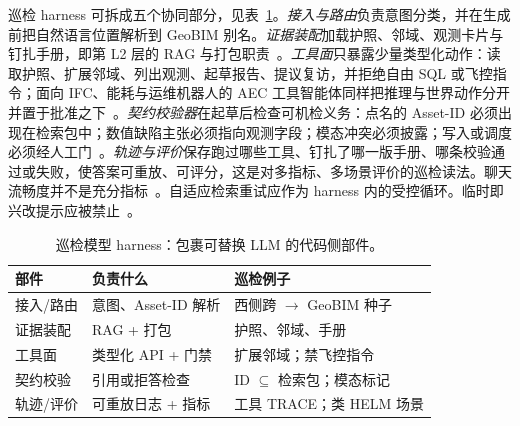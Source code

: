 巡检 harness 可拆成五个协同部分，见表~\ref{tab:ch8-harness}。\emph{接入与路由}负责意图分类，并在生成前把自然语言位置解析到 GeoBIM 别名。\emph{证据装配}加载护照、邻域、观测卡片与钉扎手册，即第 L2 层的 RAG 与打包职责~\cite{lewis2020,peng2024,krutli2025fmrags}。\emph{工具面}只暴露少量类型化动作：读取护照、扩展邻域、列出观测、起草报告、提议复访，并拒绝自由 SQL 或飞控指令；面向 IFC、能耗与运维机器人的 AEC 工具智能体同样把推理与世界动作分开并置于批准之下~\cite{gao2026ifcagent,zhang2025llmagentschema,luo2025llmdtrobot,guo2025bimllmquery}。\emph{契约校验器}在起草后检查可机检义务：点名的 Asset-ID 必须出现在检索包中；数值缺陷主张必须指向观测字段；模态冲突必须披露；写入或调度必须经人工门~\cite{ji2023,pan2024b,buga2025llmfmsql}。\emph{轨迹与评价}保存跑过哪些工具、钉扎了哪一版手册、哪条校验通过或失败，使答案可重放、可评分，这是对多指标、多场景评价的巡检读法。聊天流畅度并不是充分指标~\cite{liang2023helm,shuster2021}。自适应检索重试应作为 harness 内的受控循环。临时即兴改提示应被禁止~\cite{asai2024selfrag,jeong2024adaptive}。

\begin{table}[htbp]
\centering
\caption{巡检模型 harness：包裹可替换 LLM 的代码侧部件。}
\label{tab:ch8-harness}
\begin{tabular}{llp{4.8cm}}
\toprule
部件 & 负责什么 & 巡检例子 \\
\midrule
接入/路由 & 意图、Asset-ID 解析 & 西侧跨 $\rightarrow$ GeoBIM 种子 \\
证据装配 & RAG + 打包 & 护照、邻域、手册 \\
工具面 & 类型化 API + 门禁 & 扩展邻域；禁飞控指令 \\
契约校验 & 引用或拒答检查 & ID $\subseteq$ 检索包；模态标记 \\
轨迹/评价 & 可重放日志 + 指标 & 工具 TRACE；类 HELM 场景 \\
\bottomrule
\end{tabular}
\end{table}

